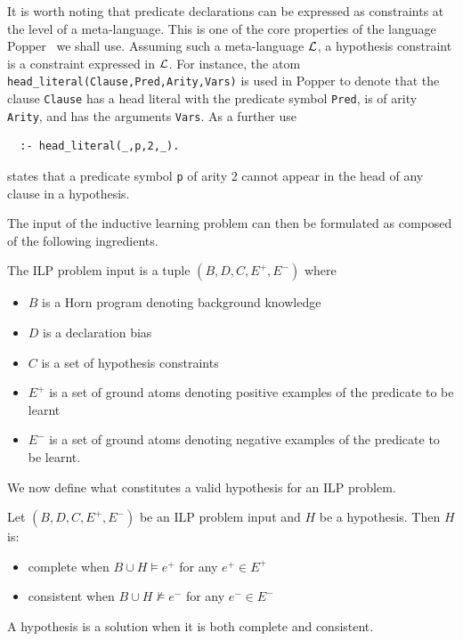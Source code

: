 \begin{sloppypar}
It is worth noting that predicate declarations can be expressed as constraints at the
level of a meta-language. This is one of the core properties of the
language Popper~\cite{cropper2021learning} 
we shall use. Assuming such a meta-language ${\cal L}$, 
a hypothesis constraint is a constraint expressed in ${\cal L}$. For instance, 
the atom \texttt{head\_literal(Clause,Pred,Arity,Vars)} is used in Popper to denote that the clause
\texttt{Clause} has a head literal with the predicate symbol \texttt{Pred}, is of arity \texttt{Arity}, and has the
arguments \texttt{Vars}. As a further use
\end{sloppypar}

\begin{lstlisting}
  :- head_literal(_,p,2,_).
\end{lstlisting}

\noindent
states that a predicate symbol \texttt{p} of arity 2 cannot appear in the head of any clause in a hypothesis.

The input of the inductive learning problem can then be formulated as composed of the following ingredients.


\begin{definition}
\label{ilp-problem}
The ILP problem input is a tuple $(B, D, C, E^+, E^-)$ where

\begin{itemize}
\item $B$ is a Horn program denoting background knowledge
\item $D$ is a declaration bias
\item $C$ is a set of hypothesis constraints
\item $E^+$ is a set of ground atoms denoting positive examples of the predicate to be learnt
\item $E^-$ is a set of ground atoms denoting negative examples of the predicate to be learnt.
\end{itemize}
\end{definition}

\noindent
We now define what constitutes a valid hypothesis for an ILP problem.

\begin{definition}
Let $(B, D, C, E^+, E^-)$ be an ILP problem input and $H$ be a hypothesis. Then $H$ is:

\begin{itemize}
    \item complete when \( B \cup H \models e^+ \) for any $e^+ \in E^+$
    \item consistent when \( B \cup H \nvDash e^- \) for any $e^- \in E^-$ 
\end{itemize}

\noindent
A hypothesis is a solution when it is both complete and consistent.
\end{definition}

